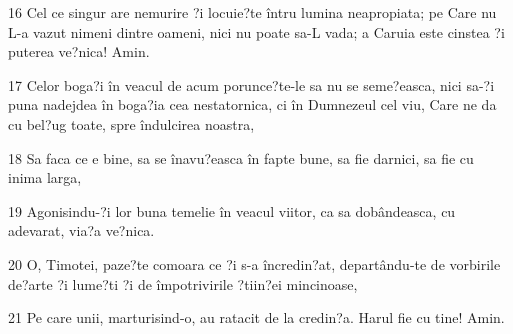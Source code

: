 \par 16 Cel ce singur are nemurire ?i locuie?te întru lumina neapropiata; pe Care nu L-a vazut nimeni dintre oameni, nici nu poate sa-L vada; a Caruia este cinstea ?i puterea ve?nica! Amin.
\par 17 Celor boga?i în veacul de acum porunce?te-le sa nu se seme?easca, nici sa-?i puna nadejdea în boga?ia cea nestatornica, ci în Dumnezeul cel viu, Care ne da cu bel?ug toate, spre îndulcirea noastra,
\par 18 Sa faca ce e bine, sa se înavu?easca în fapte bune, sa fie darnici, sa fie cu inima larga,
\par 19 Agonisindu-?i lor buna temelie în veacul viitor, ca sa dobândeasca, cu adevarat, via?a ve?nica.
\par 20 O, Timotei, paze?te comoara ce ?i s-a încredin?at, departându-te de vorbirile de?arte ?i lume?ti ?i de împotrivirile ?tiin?ei mincinoase,
\par 21 Pe care unii, marturisind-o, au ratacit de la credin?a. Harul fie cu tine! Amin.


